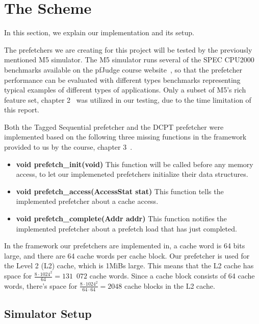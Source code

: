 \section{The Scheme}

In this section, we explain our implementation and its setup.

The prefetchers we are creating for this project will be tested by the
previously mentioned M5 simulator. The M5 simulator runs several of the SPEC
CPU2000 benchmarks available on the pfJudge course website~\cite{guidelines}, so
that the prefetcher performance can be evaluated with different types benchmarks
representing typical examples of different types of applications. Only a subset
of M5's rich feature set, chapter 2~\cite{user_doc} was utilized in our testing,
due to the time limitation of this report.

Both the Tagged Sequential prefetcher and the DCPT prefetcher were implemented
based on the following three missing functions in the framework provided to us
by the course, chapter 3~\cite{user_doc}.
\begin{itemize}
	\item \textbf{void prefetch\_init(void)}
		This function will be called before any memory access, to let our
		implemeneted prefetchers initialize their data structures.
	\item \textbf{void prefetch\_access(AccessStat stat)}
		This function tells the implemented prefetcher about a cache access.
	\item \textbf{void prefetch\_complete(Addr addr)}
		This function notifies the implemented prefetcher about a prefetch load
		that has just completed.
\end{itemize}

In the framework our prefetchers are implemented in, a cache word is 64 bits
large, and there are 64 cache words per cache block. Our prefetcher is used for
the Level 2 (L2) cache, which is 1MiBs large. This means that the L2 cache has
space for $\frac{8 \cdot 1024^{2}}{64} = 131$~$072$ cache words. Since a cache
block consists of 64 cache words, there's space for $\frac{8 \cdot 1024^{2}}{64
\cdot 64} = 2048$ cache blocks in the L2 cache.

\subsection{Simulator Setup}


